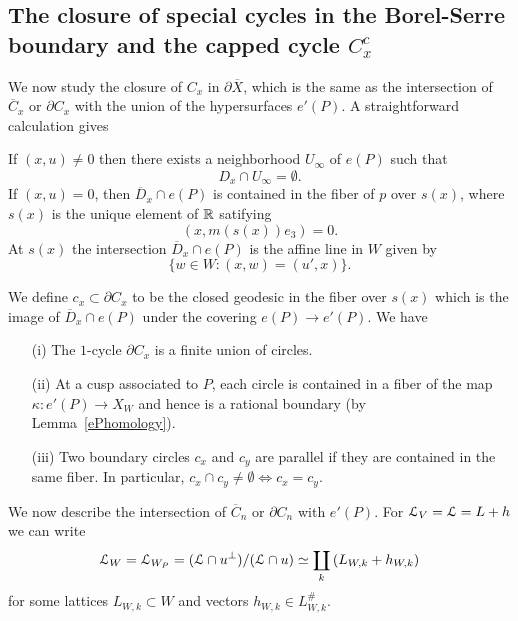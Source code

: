 \subsection{The closure of special cycles in the Borel-Serre boundary and the capped cycle $C_x^c$}

We now study the closure of $C_x$ in $\partial \overline{X}$, which is the same as the intersection of $\overline{C}_x$ or $\partial C_x$ with the union of the hypersurfaces $e'(P)$. A straightforward calculation gives 

\begin{proposition}\label{boundaryofC}
If $(x,u) \neq 0$ then there exists a neighborhood $U_{\infty}$ of $e(P)$ such that
$$
D_x \cap U_{\infty} = \emptyset.
$$
If $(x,u) = 0$, then $\overline{D}_x \cap e(P)$ is contained in the fiber of $p$ over $s(x)$, where $s(x)$ is the unique element of $\mathbb{R}$ satifying
\[
(x, m(s(x)) e_3) = 0.
\]
At $s(x)$ the intersection $\overline{D}_x \cap e(P)$ is the affine line in $W$ given by 
\[
\{ w \in W: (x,w) = (u',x)\}.
\]
\end{proposition}

We define $c_x \subset \partial C_x$ to be the closed geodesic in the fiber over $s(x)$ which is the image of $\overline{D}_x \cap e(P)$ under the covering $e(P) \to e'(P)$. We have

\begin{proposition}\label{TnBS}
\begin{enumerate}
\item[(i)] The $1$-cycle $\partial C_x$ is a finite union of circles. 
\item[(ii)] At a cusp associated to $P$, each circle is contained in a fiber of the map $\kappa: e'(P) \to X_W$ and hence is a rational boundary (by Lemma~\ref{ePhomology}). 
\item[(iii)] Two boundary circles $c_x$ and $c_y$ are parallel if they are contained in the same fiber. In particular, 
$
c_x \cap c_y \neq \emptyset \iff c_x= c_y.
$
\end{enumerate}
\end{proposition}

We now describe the intersection of $\overline{C}_n$ or $\partial C_n$ with $e'(P)$. For $\mathcal{L}_V=\mathcal{L} = L +h$ we can write
\begin{equation*}
{\mathcal{L}}_W= {\mathcal{L}}_{W_P}= (\mathcal{L} \cap u^{\perp}) / (\mathcal{L} \cap u) \simeq \coprod_k \left(L_{W,k} +
h_{W,k}\right)
\end{equation*}
for some lattices $L_{W,k} \subset W$ and vectors $h_{W,k} \in L^{\#}_{W,k}$.

